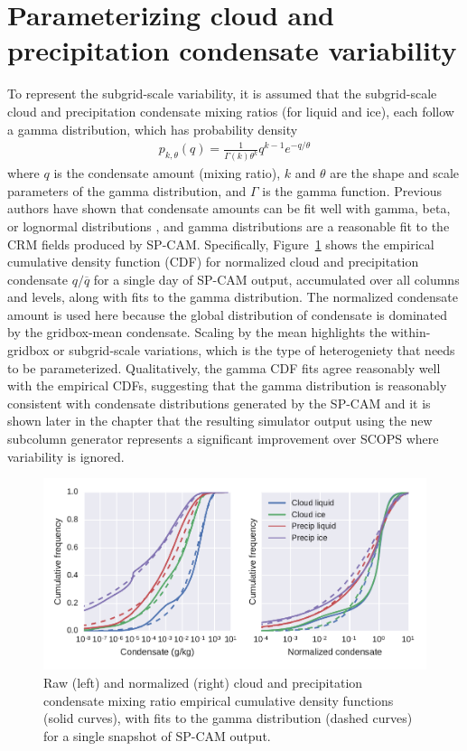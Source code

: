 \section{Parameterizing cloud and precipitation condensate
variability}\label{sec:subgrid2Variability}

To represent the subgrid-scale variability, it is assumed that the
subgrid-scale cloud and precipitation condensate mixing ratios (for
liquid and ice), each follow a gamma distribution, which has probability
density \[\begin{gathered} 
    p_{k, \theta}(q) 
        = \frac{1}{\Gamma(k) \theta^k} q^{k - 1} e^{-q/\theta}
\end{gathered}\] where \(q\) is the condensate amount (mixing ratio),
\(k\) and \(\theta\) are the shape and scale parameters of the gamma
distribution, and \(\Gamma\) is the gamma function. Previous authors
have shown that condensate amounts can be fit well with gamma, beta, or
lognormal distributions \citep[e.g.;][]{lee_et_al_2010}, and gamma
distributions are a reasonable fit to the CRM fields produced by SP-CAM.
Specifically, Figure~\ref{fig:mxratioCDF} shows the empirical cumulative
density function (CDF) for normalized cloud and precipitation condensate
\(q / \overline{q}\) for a single day of SP-CAM output, accumulated over
all columns and levels, along with fits to the gamma distribution. The
normalized condensate amount is used here because the global
distribution of condensate is dominated by the gridbox-mean condensate.
Scaling by the mean highlights the within-gridbox or subgrid-scale
variations, which is the type of heterogeniety that needs to be
parameterized. Qualitatively, the gamma CDF fits agree reasonably well
with the empirical CDFs, suggesting that the gamma distribution is
reasonably consistent with condensate distributions generated by the
SP-CAM and it is shown later in the chapter that the resulting simulator
output using the new subcolumn generator represents a significant
improvement over SCOPS where variability is ignored.

\begin{figure}[htbp]
\centering
\includegraphics{graphics/subgrid2_mxratio_cdf1.pdf}
\caption{\label{fig:mxratioCDF}Raw (left) and normalized (right) cloud
and precipitation condensate mixing ratio empirical cumulative density
functions (solid curves), with fits to the gamma distribution (dashed
curves) for a single snapshot of SP-CAM output.}\label{fig:mxratioCDF}
\end{figure}

